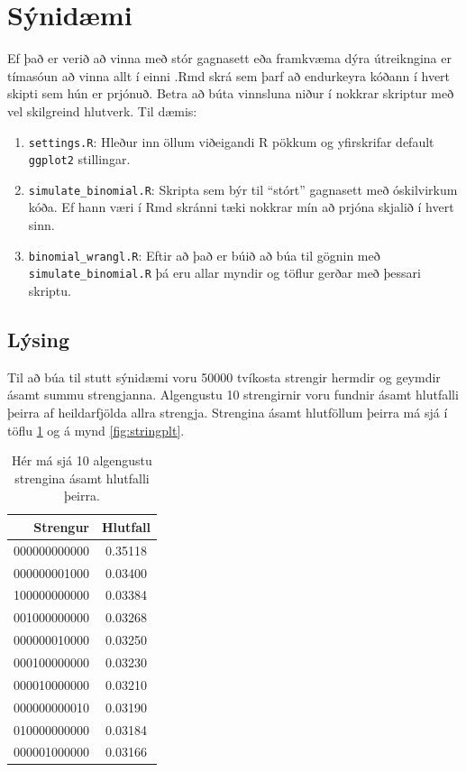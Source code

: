 \documentclass[10pt,]{article}
\begin{document}
\hypertarget{suxfdniduxe6mi}{%
\section{Sýnidæmi}\label{suxfdniduxe6mi}}

Ef það er verið að vinna með stór gagnasett eða framkvæma dýra útreikngina er tímasóun að vinna allt í einni .Rmd skrá sem þarf að endurkeyra kóðann í hvert skipti sem hún er prjónuð. Betra að búta vinnsluna niður í nokkrar skriptur með vel skilgreind hlutverk. Til dæmis:

\begin{enumerate}
\def\labelenumi{\arabic{enumi}.}
\item
  \texttt{settings.R}: Hleður inn öllum viðeigandi R pökkum og yfirskrifar default \texttt{ggplot2} stillingar.
\item
  \texttt{simulate\_binomial.R}: Skripta sem býr til ``stórt'' gagnasett með óskilvirkum kóða. Ef hann væri í Rmd skránni tæki nokkrar mín að prjóna skjalið í hvert sinn.
\item
  \texttt{binomial\_wrangl.R}: Eftir að það er búið að búa til gögnin með \texttt{simulate\_binomial.R} þá eru allar myndir og töflur gerðar með þessari skriptu.
\end{enumerate}

\hypertarget{luxfdsing}{%
\subsection{Lýsing}\label{luxfdsing}}

Til að búa til stutt sýnidæmi voru 50000 tvíkosta strengir hermdir og geymdir ásamt summu strengjanna. Algengustu 10 strengirnir voru fundnir ásamt hlutfalli þeirra af heildarfjölda allra strengja. Strengina ásamt hlutföllum þeirra má sjá í töflu \ref{tab:strings} og á mynd \ref{fig:stringplt}.

\begin{table}[!h]

\caption{\label{tab:unnamed-chunk-3}\label{tab:strings} Hér má sjá 10 algengustu strengina ásamt hlutfalli þeirra.}
\centering
\begin{tabular}[t]{rc}
\toprule
\textbf{Strengur} & \textbf{Hlutfall}\\
\midrule
000000000000 & 0.35118\\
000000001000 & 0.03400\\
100000000000 & 0.03384\\
001000000000 & 0.03268\\
000000010000 & 0.03250\\
000100000000 & 0.03230\\
000010000000 & 0.03210\\
000000000010 & 0.03190\\
010000000000 & 0.03184\\
000001000000 & 0.03166\\
\bottomrule
\end{tabular}
\end{table}
\end{document}
